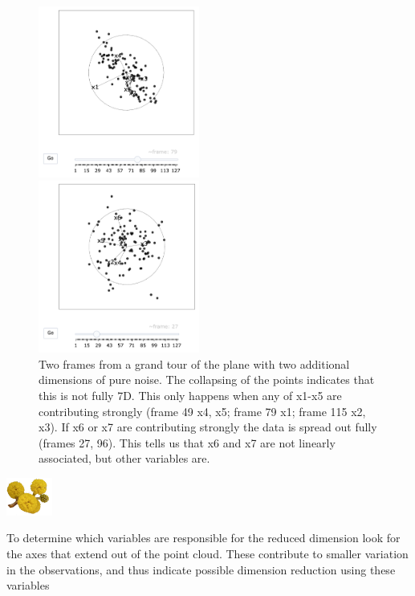 \documentclass[
  letterpaper,
]{krantz}
\newcommand{\infobox}[1]{%
\noindent\colorbox{info!30}{%
\begin{minipage}{0.98\linewidth}%
    \centering%
    \begin{minipage}[c]{0.15\linewidth} %
      \includegraphics[width=1.5cm]{images/mulga-flowers2.png} %
    \end{minipage}%
    \hfill %
    \begin{minipage}[c]{0.8\linewidth} %
      \bigskip%
      \textsf{#1}%
      \bigskip%
    \end{minipage}%
    \hspace*{3mm}%
  \end{minipage}%
}%
}
\begin{document}
\begin{figure}

\begin{minipage}{0.50\linewidth}
\begin{center}
\includegraphics[width=2.08333in,height=\textheight,keepaspectratio]{images/plane_noise1.png}
\end{center}
\end{minipage}%
%
\begin{minipage}{0.50\linewidth}
\begin{center}
\includegraphics[width=2.08333in,height=\textheight,keepaspectratio]{images/plane_noise2.png}
\end{center}
\end{minipage}%

\caption{\label{fig-plane-noise-pdf}Two frames from a grand tour of the
plane with two additional dimensions of pure noise. The collapsing of
the points indicates that this is not fully 7D. This only happens when
any of x1-x5 are contributing strongly (frame 49 x4, x5; frame 79 x1;
frame 115 x2, x3). If x6 or x7 are contributing strongly the data is
spread out fully (frames 27, 96). This tells us that x6 and x7 are not
linearly associated, but other variables are. }

\end{figure}%

\infobox{To determine which variables are responsible for the reduced dimension look for the axes that extend out of the point cloud. These contribute to smaller variation in the observations, and thus indicate possible dimension reduction using these variables}
\end{document}
